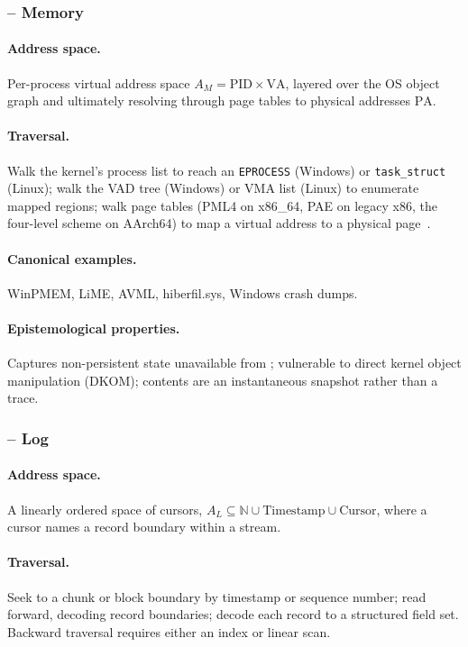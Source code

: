 \subsubsection{ -- Memory}

\paragraph{Address space.} Per-process virtual address space $A_{M} =
\mathrm{PID} \times \mathrm{VA}$, layered over the OS object graph and
ultimately resolving through page tables to physical addresses
$\mathrm{PA}$.
\paragraph{Traversal.} Walk the kernel's process list to reach an
\texttt{EPROCESS} (Windows) or \texttt{task\_struct} (Linux); walk the VAD
tree (Windows) or VMA list (Linux) to enumerate mapped regions; walk page
tables (PML4 on x86\_64, PAE on legacy x86, the four-level scheme on
AArch64) to map a virtual address to a physical
page~\cite{ligh2014artmemory,case2017memory}.
\paragraph{Canonical examples.} WinPMEM, LiME, AVML, hiberfil.sys,
Windows crash dumps.
\paragraph{Epistemological properties.} Captures non-persistent state
unavailable from ; vulnerable to direct kernel object manipulation
(DKOM); contents are an instantaneous snapshot rather than a trace.

\subsubsection{ -- Log}

\paragraph{Address space.} A linearly ordered space of cursors, $A_{L}
\subseteq \mathbb{N} \cup \mathrm{Timestamp} \cup \mathrm{Cursor}$, where a
cursor names a record boundary within a stream.
\paragraph{Traversal.} Seek to a chunk or block boundary by timestamp or
sequence number; read forward, decoding record boundaries; decode each record
to a structured field set. Backward traversal requires either an index or
linear scan.
